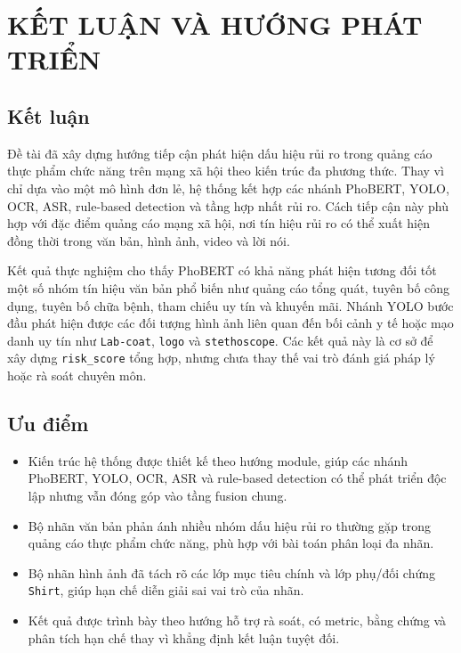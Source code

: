 \chapter{KẾT LUẬN VÀ HƯỚNG PHÁT TRIỂN}

\section{Kết luận}
Đề tài đã xây dựng hướng tiếp cận phát hiện dấu hiệu rủi ro trong quảng cáo thực phẩm chức năng trên mạng xã hội theo kiến trúc đa phương thức. Thay vì chỉ dựa vào một mô hình đơn lẻ, hệ thống kết hợp các nhánh PhoBERT, YOLO, OCR, ASR, rule-based detection và tầng hợp nhất rủi ro. Cách tiếp cận này phù hợp với đặc điểm quảng cáo mạng xã hội, nơi tín hiệu rủi ro có thể xuất hiện đồng thời trong văn bản, hình ảnh, video và lời nói.

Kết quả thực nghiệm cho thấy PhoBERT có khả năng phát hiện tương đối tốt một số nhóm tín hiệu văn bản phổ biến như quảng cáo tổng quát, tuyên bố công dụng, tuyên bố chữa bệnh, tham chiếu uy tín và khuyến mãi. Nhánh YOLO bước đầu phát hiện được các đối tượng hình ảnh liên quan đến bối cảnh y tế hoặc mạo danh uy tín như \texttt{Lab-coat}, \texttt{logo} và \texttt{stethoscope}. Các kết quả này là cơ sở để xây dựng \texttt{risk\_score} tổng hợp, nhưng chưa thay thế vai trò đánh giá pháp lý hoặc rà soát chuyên môn.

\section{Ưu điểm}
\begin{itemize}
    \item Kiến trúc hệ thống được thiết kế theo hướng module, giúp các nhánh PhoBERT, YOLO, OCR, ASR và rule-based detection có thể phát triển độc lập nhưng vẫn đóng góp vào tầng fusion chung.
    \item Bộ nhãn văn bản phản ánh nhiều nhóm dấu hiệu rủi ro thường gặp trong quảng cáo thực phẩm chức năng, phù hợp với bài toán phân loại đa nhãn.
    \item Bộ nhãn hình ảnh đã tách rõ các lớp mục tiêu chính và lớp phụ/đối chứng \texttt{Shirt}, giúp hạn chế diễn giải sai vai trò của nhãn.
    \item Kết quả được trình bày theo hướng hỗ trợ rà soát, có metric, bằng chứng và phân tích hạn chế thay vì khẳng định kết luận tuyệt đối.
\end{itemize}

